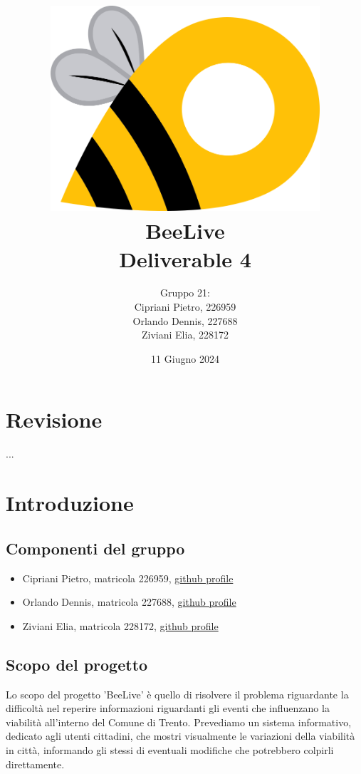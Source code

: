 \documentclass{article}
\title{\includegraphics[width=0.75\textwidth]{Images/BeeLive-Logo.png}\\\vspace{100pt}
\LARGE{\textbf{BeeLive\\Deliverable 4}}}
\author{Gruppo 21:\\
Cipriani Pietro, 226959\\
Orlando Dennis, 227688\\
Ziviani Elia, 228172}
\date{11 Giugno 2024}
\begin{document}
\maketitle
\thispagestyle{firstpage} %
\clearpage

\pagestyle{nonplain} %

\renewcommand{\contentsname}{Indice}
\tableofcontents

\clearpage

\section{Revisione}
...

\section{Introduzione}

\subsection{Componenti del gruppo}
\begin{itemize}
    \item Cipriani Pietro, matricola 226959, \lbrack\href{https://github.com/pietrocipriani}{github profile}\rbrack
    \item Orlando Dennis, matricola 227688, \lbrack\href{https://github.com/dennisorlando}{github profile}\rbrack
    \item Ziviani Elia, matricola 228172, \lbrack\href{https://github.com/ELI20ZIVI}{github profile}\rbrack
\end{itemize}

\subsection{Scopo del progetto}

Lo scopo del progetto 'BeeLive' è quello di risolvere il problema riguardante la difficoltà nel reperire informazioni riguardanti gli eventi che influenzano la viabilità all'interno del Comune di Trento. Prevediamo un sistema informativo, dedicato agli utenti cittadini, che mostri visualmente le variazioni della viabilità in città, informando gli stessi di eventuali modifiche che potrebbero colpirli direttamente.
\end{document}
